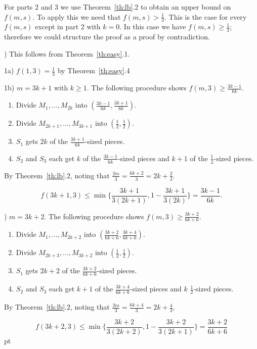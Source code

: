 \documentclass[12pt]{article}
\newenvironment{proof}
    {\pagebreak[1]{\narrower\noindent {\bf Proof:\quad\nopagebreak}}}{\QED}
\newcommand{\yyskip}{\penalty-50\vskip 5pt plus 3pt minus 2pt}
\newcommand{\blackslug}{\hbox{\hskip 1pt
        \vrule width 4pt height 8pt depth 1.5pt\hskip 1pt}}
\newcommand{\QED}{{\penalty10000\parindent 0pt\penalty10000
        \hskip 8 pt\nolinebreak\blackslug\hfill\lower 8.5pt\null}
        \par\yyskip\pagebreak[1]}
\begin{document}
\begin{proof}

For parts 2 and 3 we use 
Theorem~\ref{th:lb}.2 to obtain an upper bound on $f(m,s)$.
To apply this we need that $f(m,s)>\frac{1}{3}$. 
This is the case for every $f(m,s)$ except in part 2 with $k=0$.
In this case we have $f(m,s)\ge \frac{1}{3}$; therefore we could structure
the proof as a proof by contradiction. 

) This follows from Theorem~\ref{th:easy}.1.

\noindent
1a) $f(1,3)=\frac{1}{3}$ by Theorem~\ref{th:easy}.4

\noindent
1b) $m=3k+1$ with $k\ge 1$.  
The following procedure shows $f(m,3) \ge \frac{3k-1}{6k}$.
\begin{enumerate}
\item
Divide $M_1,\ldots,M_{2k}$ into $(\frac{3k-1}{6k},\frac{3k+1}{6k})$.
\item
Divide $M_{2k+1},\ldots,M_{3k+1}$ into  $(\frac{1}{2},\frac{1}{2})$.
\item
$S_1$ gets $2k$ of the $\frac{3k+1}{6k}$-sized pieces.
\item
$S_2$ and $S_3$ each get $k$ of the $\frac{3k-1}{6k}$-sized pieces and 
$k+1$ of the $\frac{1}{2}$-sized pieces.
\end{enumerate}

By Theorem~\ref{th:lb}.2, noting 
that $\frac{2m}{3}= \frac{6k+2}{3} = 2k+\frac{2}{3}$.

$$f(3k+1,3) \le  
\min\biggl \{
\frac{3k+1}{3(2k+1)},
1-\frac{3k+1}{3(2k)}
\biggr \}
=
\frac{3k-1}{6k}.
$$

) $m=3k+2$.
The following procedure shows $f(m,3) \ge \frac{3k+2}{6k+6}$.
\begin{enumerate}
\item
Divide $M_1,\ldots,M_{2k+2}$ into  $(\frac{3k+2}{6k+6},\frac{3k+4}{6k+6})$.
\item
Divide $M_{2k+3},\ldots,M_{3k+2}$ into   $(\frac{1}{2},\frac{1}{2})$.
\item
$S_1$ gets $2k+2$ of the $\frac{3k+2}{6k+6}$-sized pieces.
\item
$S_2$ and $S_3$ each get $k+1$ of the 
$\frac{3k+4}{6k+6}$-sized pieces and $k$ $\frac{1}{2}$-sized pieces.
\end{enumerate}

By Theorem~\ref{th:lb}.2, noting that 
$\frac{2m}{3}=\frac{6k+4}{3}= 2k + \frac{4}{3}$,

$$f(3k+2,3) \le  \min\biggl \{
\frac{3k+2}{3(2k+2)},
1-\frac{3k+2}{3(2k+1)}
\biggr \}
=
\frac{3k+2}{6k+6}
$$
\end{proof}
\end{document}

